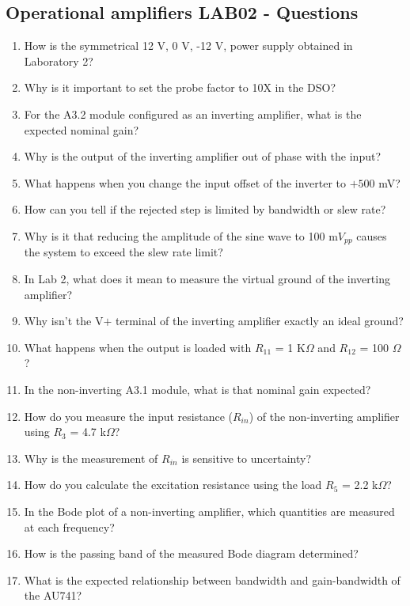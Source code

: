 \documentclass[../main.tex]{subfiles}
\begin{document}
\vspace*{1.5cm}
\subsection{Operational amplifiers LAB02 - Questions}

\begin{enumerate}[label=\textbf{\arabic*.}]
	\item How is the symmetrical 12 V, 0 V, -12 V, power supply obtained in Laboratory 2? 
	\item Why is it important to set the probe factor to 10X in the DSO?
	\item For the A3.2 module configured as an inverting amplifier, what is the expected nominal gain?
	\item Why is the output of the inverting amplifier out of phase with the input?
	\item What happens when you change the input offset of the inverter to $+500$ mV?
	\item How can you tell if the rejected step is limited by bandwidth or slew rate?
	\item Why is it that reducing the amplitude of the sine wave to 100 m$V_{pp}$ causes the system to exceed the slew rate limit?
	\item In Lab 2, what does it mean to measure the virtual ground of the inverting amplifier?
	\item Why isn't the V$+$ terminal of the inverting amplifier exactly an ideal ground?
	\item What happens when the output is loaded with $R_{11}$ = 1 K$\Omega$ and $R_{12}$ = 100 $\Omega$?
	\item In the non-inverting A3.1 module, what is that nominal gain expected?
	\item How do you measure the input resistance ($R_{in}$) of the non-inverting amplifier using $R_3$ = 4.7 k$\Omega$?
	\item Why is the measurement of $R_{in}$ is sensitive to uncertainty?
	\item How do you calculate the excitation resistance using the load $R_5$ = 2.2 k$\Omega$?
	\item In the Bode plot of a non-inverting amplifier, which quantities are measured at each frequency?
	\item How is the passing band of the measured Bode diagram determined?
	\item What is the expected relationship between bandwidth and gain-bandwidth of the AU741?

\end{enumerate}
\end{document}

